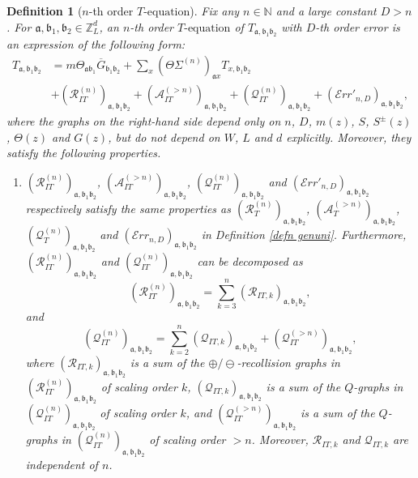 \documentclass{article}
\newcommand{\1}{\mathds{1}}
\numberwithin{equation}{section}
\newcommand{\be}{\begin{equation}}
\newcommand{\ee}{\end{equation}}
\newcommand{\fa}{{\mathfrak a}}
\newcommand{\fb}{{\mathfrak b}}
\renewcommand{\cal}{\mathcal}
\renewcommand{\leq}{\leqslant}
\renewcommand{\le}{\leq}
\newcommand{\N}{\mathbb{N}}
\newcommand{\Z}{\mathbb{Z}}
\DeclareMathOperator{\OO}{O}
\theoremstyle{plain} %
\newtheorem{definition}[theorem]{Definition}
\theoremstyle{remark}
\newcommand{\Sdelta}{{\Sigma}_T}
\newcommand{\wtSdeltan}{\Sigma^{(n)}}
\newcommand{\incomp}{{\text{$T$-equation}}}
\newcommand{\PTn}{\mathcal R_T^{(n)}}
\newcommand{\PITn}{{\mathcal R_{IT}^{(n)}}}
\newcommand{\PITk}{{\mathcal R_{IT,k}}}
\newcommand{\QTn}{\mathcal Q_T^{(n)}}
\newcommand{\QITn}{{\mathcal Q_{IT}^{(n)}}}
\newcommand{\QITk}{{\mathcal Q_{IT,k}}}
\newcommand{\ATn}{\mathcal A_T^{(>n)}}
\newcommand{\AITn}{{\mathcal A_{IT}^{(>n)}}}
\newcommand{\Err}{{\mathcal Err}}
\begin{document}
\begin{definition} [$n$-th order $\incomp$]\label{def incompgenuni}
Fix any $n\in \N$ and a large constant $D>n$. For $\fa, \fb_1,\fb_2 \in \Z_L^d$, an $n$-th order $\incomp$ of $T_{\fa,\fb_1\fb_2}$ with $D$-th order error is an expression of the following form: %
	\be \label{mlevelT incomplete}
	\begin{split}
		T_{\fa,\fb_1 \fb_2} &= m  \Theta_{\fa \fb_1}\overline G_{\fb_1\fb_2}   +\sum_x (\Theta \wtSdeltan)_{\fa x} T_{x,\fb_1\fb_2} \\
		&+ (\PITn)_{\fa,\fb_1 \fb_2} +  (\AITn)_{\fa,\fb_1 \fb_2} + (\QITn)_{\fa,\fb_1 \fb_2} + (\Err'_{n,D})_{\fa,\fb_1\fb_2}  ,
	\end{split}
	\ee
	where the graphs on the right-hand side depend only on $n$, $D$, $m(z)$, $S$, $S^{\pm}(z)$, $\Theta(z)$ and $G(z)$, but do not depend on $W$, $L$ and $d$ explicitly. %
	Moreover, they satisfy the following properties.
	\begin{enumerate}
		\item  $(\PITn)_{\fa,\fb_1 \fb_2}$, $(\AITn)_{\fa,\fb_1 \fb_2}$, $(\QITn)_{\fa,\fb_1 \fb_2}$ and $(\Err'_{n,D})_{\fa,\fb_1\fb_2}$ respectively satisfy the same properties as $(\PTn)_{\fa,\fb_1 \fb_2}$, $(\ATn)_{\fa,\fb_1 \fb_2}$, $(\QTn)_{\fa,\fb_1 \fb_2}$ and $(\Err_{n,D})_{\fa,\fb_1\fb_2}$ in Definition \ref{defn genuni}. Furthermore,  $(\PITn)_{\fa,\fb_1 \fb_2}$ and $(\QITn)_{\fa,\fb_1 \fb_2}$ can be decomposed as
		\be\label{decomposePIT}(\PITn)_{\fa,\fb_1\fb_2} =\sum_{ k =3}^{ n}(\PITk)_{\fa,\fb_1\fb_2},\ee
		and
		\be\label{decomposeQIT} (\QITn)_{\fa,\fb_1\fb_2}= \sum_{k=2}^{n} (\QITk)_{\fa,\fb_1\fb_2} + (\cal Q^{(>n)}_{IT})_{\fa,\fb_1\fb_2},\ee
		where  $(\PITk)_{\fa,\fb_1\fb_2}$ is a sum of the $\oplus/\ominus$-recollision graphs in $(\PITn)_{\fa,\fb_1\fb_2}$ of scaling order $k$,  $(\QITk)_{\fa,\fb_1\fb_2}$ is a sum of the $Q$-graphs in $(\QITn)_{\fa,\fb_1 \fb_2}$ of scaling order $k$, and $(\cal Q^{(>n)}_{IT})_{\fa,\fb_1\fb_2}$ is a sum of the $Q$-graphs in  $(\cal Q^{(n)}_{IT})_{\fa,\fb_1\fb_2}$ of scaling order $>n$.  Moreover, $\PITk$ and $\QITk$ are independent of $n$.
		

\end{enumerate}
\end{definition}
\end{document}

